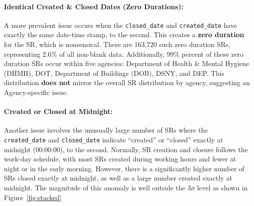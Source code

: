 \documentclass[linenumber]{jdsart}
\begin{document}
\paragraph{Identical Created \& Closed Dates (Zero Durations):}
A more prevalent issue occurs when the \texttt{closed\_date} and 
\texttt{created\_date} have exactly the same date\mbox{-}time stamp, 
to the second. This creates a \textbf{zero duration} for the 
SR, which is nonsensical. There are 163,720 such zero duration 
SRs, representing 2.6\% of all non\mbox{-}blank data. 
Additionally, 99\% percent of these zero duration SRs 
occur within five agencies: Department of Health \& Mental 
Hygiene (DHMH), DOT, Department of Buildings (DOB), DSNY, and 
DEP. This distribution \textbf{does not} 
mirror the overall SR distribution by agency, suggesting 
an Agency\mbox{-}specific issue.
	
\paragraph{Created or Closed at Midnight:}
Another issue involves the unusually large number of 
SRs where the \texttt{created\_date} and \texttt{closed\_date} 
indicate ``created'' or ``closed'' exactly at midnight (00:00:00), 
to the second. Normally, SR creation and closure follows 
the work\mbox{-}day schedule, with most SRs created 
during working hours and fewer at night or in the 
early morning. However, there is a significantly higher 
number of SRs closed exactly at midnight, as well 
as a large number created exactly at midnight. The magnitude 
of this anomaly is well outside the 3$\sigma$ level as shown 
in Figure~\ref{fig:stacked}
\end{document}
